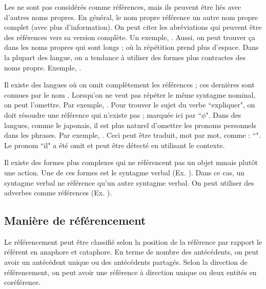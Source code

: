 \documentclass{KodeBook}
\begin{document}
Les  ne sont pas considérés comme références, mais ils peuvent être liés avec d'autres noms propres. 
En général, le nom propre référence un autre nom propre complet (avec plus d'information). 
On peut citer les abréviations qui peuvent être des références vers sa version complète.
Un exemple, .
Aussi, on peut trouver ça dans les noms propres qui sont longs ; où la répétition prend plus d'espace. 
Dans la plupart des langue, on a tendance à utiliser des formes plus contractes des noms propre. 
Exemple, .

Il existe des langues où on omit complètement les références ; ces dernières sont connues par le nom . 
Lorsqu'on ne veut pas répéter le même syntagme nominal, on peut l'omettre. 
Par exemple, .
Pour trouver le sujet du verbe ``expliquer", on doit résoudre une référence qui n'existe pas ; marquée ici par ``$ \phi $".
Dans des langues, comme le japonais, il est plus naturel d'omettre les pronoms personnels dans les phrases. 
Par exemple, . 
Ceci peut être traduit, mot par mot, comme : ``".
Le pronom ``il" a été omit et peut être détecté en utilisant le contexte.

Il existe des formes plus complexes qui ne référencent pas un objet mmais plutôt une action.
Une de ces formes est le syntagme verbal (Ex. ).
Dans ce cas, un syntagme verbal ne référence qu'un autre syntagme verbal. 
On peut utiliser des adverbes comme références (Ex. ).


\subsection{Manière de référencement}

Le référencement peut être classifié selon la position de la référence par rapport le référent en anaphore et cataphore. 
En terme de nombre des antécédents, on peut avoir un antécédent unique ou des antécédents partagés. 
Selon la direction de référencement, on peut avoir une référence à direction unique ou deux entités en coréférence.
\end{document}
